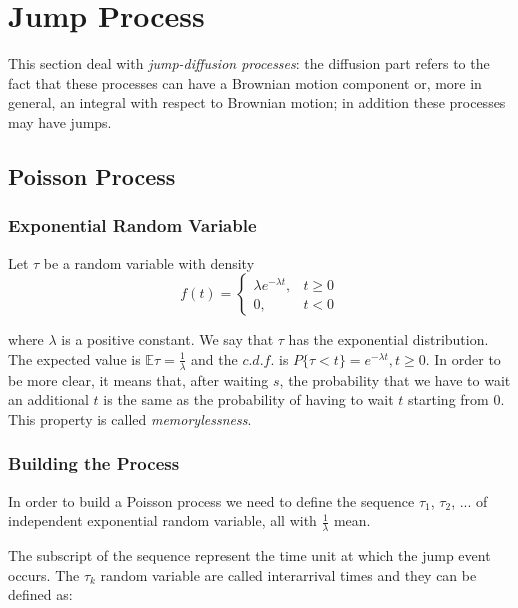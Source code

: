 \documentclass[paper=a4, fontsize=12pt]{scrartcl} %
\numberwithin{equation}{section}
\begin{document}
\section{Jump Process}
This section deal with \textit{jump-diffusion processes}: the diffusion part refers to the fact that these processes can have a Brownian motion component or, more in general, an integral with respect to Brownian motion; in addition these processes may have jumps.

\subsection{Poisson Process}
\subsubsection{Exponential Random Variable}
Let $\tau$ be a random variable with density
	\begin{equation}
		f(t) = \begin{cases} \lambda e^{-\lambda t} , & t \geq 0 \\ 0, & t < 0 \end{cases}
	\end{equation}

where $\lambda$ is a positive constant. We say that $\tau$ has the exponential distribution.
The expected value is $ \mathbb{E}\tau = \frac{1}{\lambda}$ and the $c.d.f.$ is $P\{\tau<t\} = e^{-\lambda t}, t \geq 0$. In order to be more clear, it means that, after waiting $s$,  the probability that we have to wait an additional $t$ is the same as the probability of having to wait $t$ starting from $0$. This property is called \textit{memorylessness}.

\subsubsection{Building the Process}
In order to build a Poisson process we need to define the sequence $\tau_1$, $\tau_2$, $...$ of independent exponential random variable, all with $\frac{1}{\lambda}$ mean. \par 
The subscript of the sequence represent the time unit at which the jump event occurs. The $\tau_k$ random variable are called interarrival times and they can be defined as:
	
\end{document}
